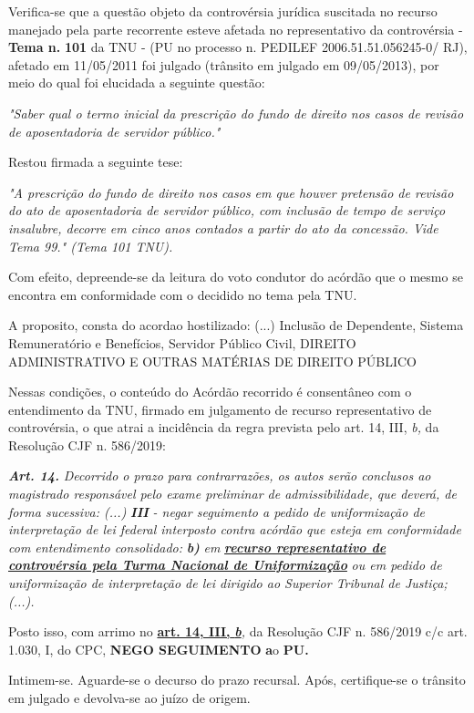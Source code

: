\documentclass[12pt]{article}
\begin{document}
\justifying
\noindent Verifica-se que a questão objeto da controvérsia jurídica suscitada no recurso manejado pela parte recorrente esteve afetada no representativo da controvérsia - \textbf{Tema n. }\textbf{101} da TNU - (PU no processo n. PEDILEF 2006.51.51.056245-0/ RJ),  afetado em 11/05/2011 foi julgado (trânsito em julgado em 09/05/2013), por meio do qual foi elucidada a seguinte questão:

\noindent \textit{"Saber qual o termo inicial da prescrição do fundo de direito nos casos de revisão de aposentadoria de servidor público."}

\noindent Restou firmada a seguinte tese:

\noindent \textit{"A prescrição do fundo de direito nos casos em que houver pretensão de revisão do ato de aposentadoria de servidor público, com inclusão de tempo de serviço insalubre, decorre em cinco anos contados a partir do ato da concessão. Vide Tema 99." (Tema 101 TNU).}

\noindent Com efeito, depreende-se da leitura do voto condutor do acórdão que o mesmo se encontra em conformidade com o decidido no  tema pela TNU.

\noindent A proposito, consta do acordao hostilizado: (...) Inclusão de Dependente, Sistema Remuneratório e Benefícios, Servidor Público Civil, DIREITO ADMINISTRATIVO E OUTRAS MATÉRIAS DE DIREITO PÚBLICO

\noindent Nessas condições, o conteúdo do Acórdão recorrido é consentâneo com o entendimento da TNU, firmado em julgamento de recurso representativo de controvérsia, o que atrai a incidência da regra prevista pelo art. 14, III, \textit{b,} da Resolução CJF n. 586/2019:

\noindent \textit{\textbf{Art. 14.}}\textit{ Decorrido o prazo para contrarrazões, os autos serão conclusos ao magistrado responsável pelo exame preliminar de admissibilidade, que deverá, de forma sucessiva: (...) }\textit{\textbf{III }}\textit{- negar seguimento a pedido de uniformização de interpretação de lei federal interposto contra acórdão que esteja em conformidade com entendimento consolidado: }\textit{\textbf{b)}}\textit{ em }\uline{\textit{\textbf{recurso representativo de controvérsia pela Turma Nacional de Uniformização}}}\textit{ ou em pedido de uniformização de interpretação de lei dirigido ao Superior Tribunal de Justiça;(...).}

\noindent Posto isso, com arrimo no \uline{\textbf{art. 14, III, }}\uline{\textit{\textbf{b}}}\textit{,} da Resolução CJF n. 586/2019 c/c art. 1.030, I, do CPC, \textbf{NEGO SEGUIMENTO }\textbf{a}o\textbf{ PU}\textbf{.}

\noindent Intimem-se. Aguarde-se o decurso do prazo recursal. Após, certifique-se o trânsito em julgado e devolva-se ao juízo de origem.
\end{document}
